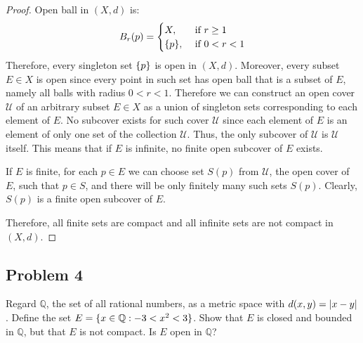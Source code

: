 \documentclass{article}
\newcommand{\Q}{\mathbb{Q}}
\DeclarePairedDelimiter{\abs}{\lvert}{\rvert}
\DeclarePairedDelimiter{\set}{ \{ }{ \} }
\begin{document}
\begin{proof}

Open ball in $(X, d)$ is:
\[
    B_r(p)=
    \begin{cases}
    X, & \text{ if } r \geq 1 \\
    \set{ p }, & \text{ if } 0 < r < 1
    \end{cases}
\]
Therefore, every singleton set $\set{ p }$ is open in $(X, d)$. 
Moreover, every subset $E \in X$ is open since every point in such set has open ball that is a subset of $E$, namely all balls with radius $0 < r < 1$.
Therefore we can construct an open cover $\mathcal{U}$ of an arbitrary subset $E \in X$ as a union of singleton sets corresponding to each element of $E$.
No subcover exists for such cover $\mathcal{U}$ since each element of $E$ is an element of only one set of the collection $\mathcal{U}$.
Thus, the only subcover of $\mathcal{U}$ is $\mathcal{U}$ itself.
This means that if $E$ is infinite, no finite open subcover of $E$ exists.

If $E$ is finite, for each $p \in E$ we can choose set $S(p)$ from $\mathcal{U}$, the open cover of $E$, such that $p \in S$, and there will be only finitely many such sets $S(p)$.
Clearly, $S(p)$ is a finite open subcover of $E$.

Therefore, all finite sets are compact and all infinite sets are not compact in $(X, d)$.

\end{proof}


\subsection*{Problem 4}

\begin{tcolorbox}
Regard $\Q$, the set of all rational numbers, as a metric space with $d(x, y) = \abs{ x-y }$.
Define the set $E = \set{x \in \Q : -3 < x^2 < 3}$.
Show that $E$ is closed and bounded in $\Q$, but that $E$ is not compact.
Is $E$ open in $\Q$?
\end{tcolorbox}
\end{document}
